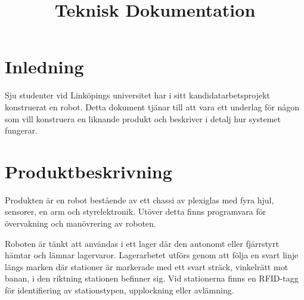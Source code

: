 \documentclass[a4paper,12pt]{article}
\title{Teknisk Dokumentation}
\renewcommand{\thepage}{\roman{page}}
\begin{document}
\LIPStitelsida

\begin{LIPSprojektidentitet}
\end{LIPSprojektidentitet}


\setlength\cftparskip{4pt}

\renewcommand*\contentsname{Innehåll}
\begin{spacing}{0.5}
\tableofcontents{}
\end{spacing}
\newpage

\begin{LIPSdokumenthistorik}
\end{LIPSdokumenthistorik}
\newpage

\renewcommand{\thepage}{\arabic{page}}
\setcounter{page}{1}

\section{Inledning}
Sju studenter vid Linköpings universitet har i sitt kandidatarbetsprojekt konstruerat en robot. Detta dokument tjänar till att vara ett underlag för någon som vill konstruera en liknande produkt och beskriver i detalj hur systemet fungerar.

\section{Produktbeskrivning}
Produkten är en robot bestående av ett chassi av plexiglas med fyra hjul, sensorer, en arm och styrelektronik. Utöver detta finns programvara för övervakning och manövrering av roboten.

Roboten är tänkt att användas i ett lager där den autonomt eller fjärrstyrt hämtar och lämnar lagervaror. Lagerarbetet utförs genom att följa en svart linje längs marken där stationer är markerade med ett svart sträck, vinkelrätt mot banan, i den riktning stationen befinner sig. Vid stationerna finns en RFID-tagg för identifiering av stationstypen, upplockning eller avlämning.
\end{document}
